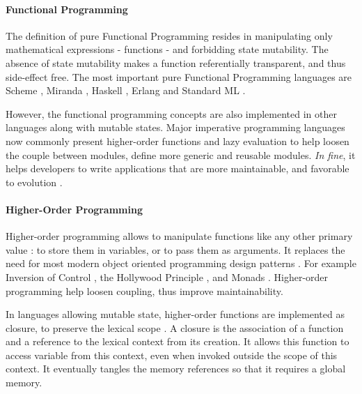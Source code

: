 \paragraph{Functional Programming} \label{chapter3:software-design:programming-models:functional-programming}


The definition of pure Functional Programming resides in manipulating only mathematical expressions - functions - and forbidding state mutability.
The absence of state mutability makes a function referentially transparent, and thus side-effect free.
The most important pure Functional Programming languages are Scheme \cite{Rees1986}, Miranda \cite{Turner1986}, Haskell \cite{Hudak1992}, Erlang \cite{JoeArmstrong} and Standard ML \cite{Milner1997}.

However, the functional programming concepts are also implemented in other languages along with mutable states.
Major imperative programming languages now commonly present higher-order functions and lazy evaluation to help loosen the couple between modules, define more generic and reusable modules.
\textit{In fine}, it helps developers to write applications that are more maintainable, and favorable to evolution \cite{Hughes1989,Turner1981}.

\paragraph{Higher-Order Programming}

Higher-order programming allows to manipulate functions like any other primary value : to store them in variables, or to pass them as arguments.
It replaces the need for most modern object oriented programming design patterns .
For example Inversion of Control \cite{Johnson}, the Hollywood Principle \cite{Sweet1985}, and Monads \cite{Wadler1992}.
Higher-order programming help loosen coupling, thus improve maintainability.

In languages allowing mutable state, higher-order functions are implemented as closure, to preserve the lexical scope \cite{Sussman1998}.
A closure is the association of a function and a reference to the lexical context from its creation.
It allows this function to access variable from this context, even when invoked outside the scope of this context.
It eventually tangles the memory references so that it requires a global memory.

